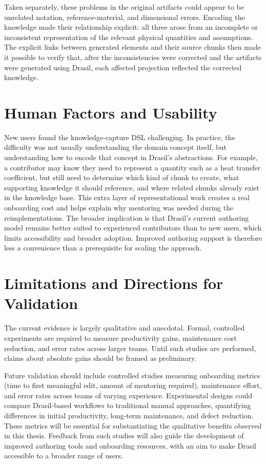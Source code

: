 Taken separately, these problems in the original artifacts could appear to be
unrelated notation, reference-material, and dimensional errors. Encoding the
\sp{} knowledge made their relationship explicit: all three arose from an
incomplete or inconsistent representation of the relevant physical quantities
and assumptions. The explicit links between generated elements and their source
chunks then made it possible to verify that, after the inconsistencies were
corrected and the artifacts were generated using Drasil, each affected
projection reflected the corrected knowledge.

\section{Human Factors and Usability}
\label{sec:dis_usability}

New users
found the knowledge-capture DSL challenging. In practice, the difficulty was
not usually understanding the domain concept itself, but understanding how to
encode that concept in Drasil's abstractions. For example, a contributor may
know they need to represent a quantity such as a heat transfer coefficient, but
still need to determine which kind of chunk to create, what supporting
knowledge it should reference, and where related chunks already exist in the
knowledge base. This extra layer of representational work creates a real
onboarding cost and helps explain why mentoring was needed during the
reimplementations. The broader implication is that Drasil's current authoring
model remains better suited to experienced contributors than to new users,
which limits accessibility and broader adoption. Improved authoring support is
therefore less a convenience than a prerequisite for scaling the approach.

\section{Limitations and Directions for Validation}
\label{sec:dis_limits}

The current evidence is largely qualitative and anecdotal. Formal,
controlled experiments are required to measure productivity gains,
maintenance cost reduction, and error rates across larger teams. Until such
studies are performed, claims about absolute gains should be framed as
preliminary.

Future validation should include controlled studies measuring onboarding 
metrics (time to first meaningful edit, amount of mentoring required),
maintenance effort, and error rates across teams of varying experience. 
Experimental designs could compare Drasil-based workflows to traditional manual 
approaches, quantifying differences in initial productivity, long-term 
maintenance, and defect reduction. These metrics will be essential for 
substantiating the qualitative benefits observed in this thesis. Feedback from 
such studies will also guide the development of improved authoring tools and 
onboarding resources, with an aim to make Drasil accessible to a broader range of users.

